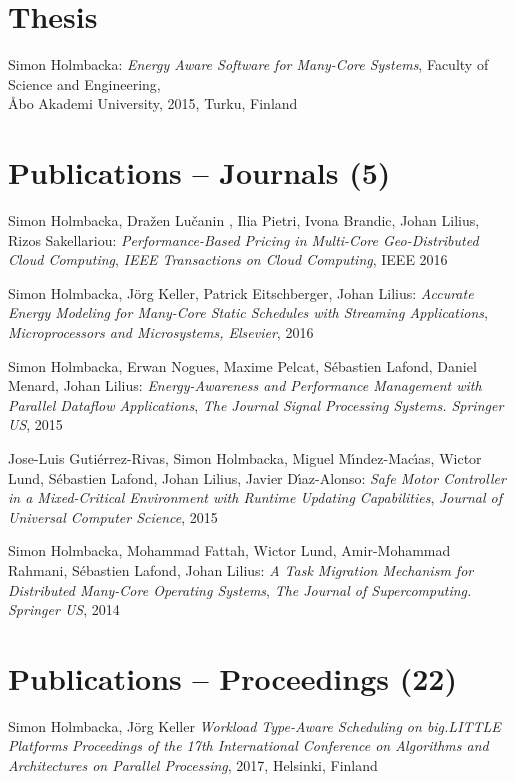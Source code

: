 \documentclass[margin,line]{resume}
\begin{document}
\begin{resume}
\section{\mysidestyle Thesis}    
Simon Holmbacka:
\textit{Energy Aware Software for Many-Core Systems},
Faculty of Science and Engineering,\\ \AA{}bo Akademi University, 2015, Turku, Finland

\section{\mysidestyle Publications -- Journals (5)}
Simon Holmbacka, Dra\v{z}en Lu\v{c}anin , Ilia Pietri, Ivona Brandic, Johan Lilius, Rizos Sakellariou:
\textit{Performance-Based Pricing in Multi-Core Geo-Distributed Cloud Computing}, 
\textsl{IEEE Transactions on Cloud Computing}, IEEE 2016

Simon Holmbacka, J\"{o}rg Keller, Patrick Eitschberger, Johan Lilius:
\textit{Accurate Energy Modeling for Many-Core Static Schedules with Streaming Applications}, 
\textsl{Microprocessors and Microsystems, Elsevier}, 2016

Simon Holmbacka, Erwan Nogues, Maxime Pelcat, S\'{e}bastien Lafond, Daniel Menard, Johan Lilius:
\textit{Energy-Awareness and Performance Management with Parallel Dataflow Applications}, 
\textsl{The Journal Signal Processing Systems. Springer US}, 2015

Jose-Luis Guti\'{e}rrez-Rivas, Simon Holmbacka, Miguel M\'{\i}ndez-Mac\'{\i}as, Wictor Lund, S\'{e}bastien Lafond, Johan Lilius, Javier D\'{\i}az-Alonso:
\textit{Safe Motor Controller in a Mixed-Critical Environment with Runtime Updating Capabilities}, 
\textsl{Journal of Universal Computer Science}, 2015

Simon Holmbacka, Mohammad Fattah, Wictor Lund, Amir-Mohammad Rahmani, S\'{e}bastien Lafond, Johan Lilius:
\textit{A Task Migration Mechanism for Distributed Many-Core Operating Systems}, 
\textsl{The Journal of Supercomputing. Springer US}, 2014 


\section{\mysidestyle Publications -- Proceedings (22)}
Simon Holmbacka, J\"{o}rg Keller
\textit{Workload Type-Aware Scheduling on big.LITTLE Platforms}
\textsl{Proceedings of the 17th International Conference on Algorithms and Architectures on Parallel Processing}, 2017, Helsinki, Finland


\end{resume}
\end{document}

